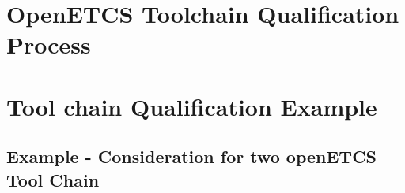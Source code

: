 \documentclass{template/openetcs_report}
\begin{document}
\chapter{OpenETCS Toolchain Qualification Process}
\label{chap:qualification-process}


\chapter{Tool chain Qualification Example}
\section{Example - Consideration for two openETCS Tool Chain}





\end{document}
